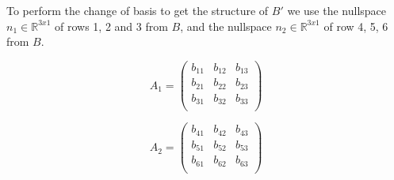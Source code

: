 To perform the change of basis to get the structure of $B'$ we use the nullspace $n_1 \in \mathbb{R}^{3x1}$ of rows 1, 2 and 3 from $B$, and the nullspace $n_2 \in \mathbb{R}^{3x1}$ of row 4, 5, 6 from $B$.

\[
A_1 = 
\begin{pmatrix}
b_{11} & b_{12} & b_{13} \\
b_{21} & b_{22} & b_{23} \\
b_{31} & b_{32} & b_{33} \\
\end{pmatrix}
\]

\[
A_2 = 
\begin{pmatrix}
b_{41} & b_{42} & b_{43} \\
b_{51} & b_{52} & b_{53} \\
b_{61} & b_{62} & b_{63} \\
\end{pmatrix}
\]